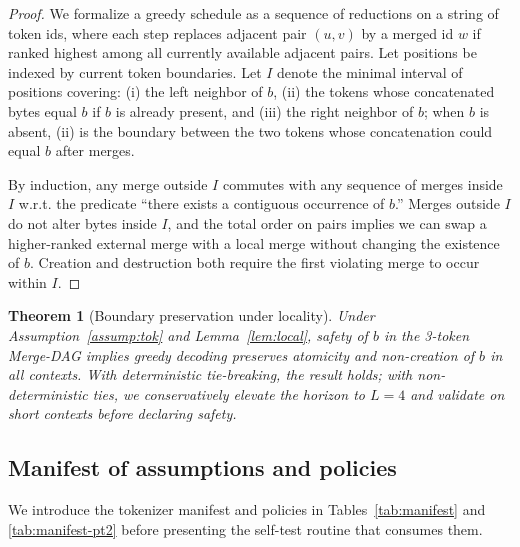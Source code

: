 \documentclass{article}
\newtheorem{theorem}{Theorem}
\begin{document}
\begin{proof}
We formalize a greedy schedule as a sequence of reductions on a string of token ids, where each step replaces adjacent pair $(u,v)$ by a merged id $w$ if ranked highest among all currently available adjacent pairs. Let positions be indexed by current token boundaries. Let $I$ denote the minimal interval of positions covering: (i) the left neighbor of $b$, (ii) the tokens whose concatenated bytes equal $b$ if $b$ is already present, and (iii) the right neighbor of $b$; when $b$ is absent, (ii) is the boundary between the two tokens whose concatenation could equal $b$ after merges.

By induction, any merge outside $I$ commutes with any sequence of merges inside $I$ w.r.t. the predicate ``there exists a contiguous occurrence of $b$.'' Merges outside $I$ do not alter bytes inside $I$, and the total order on pairs implies we can swap a higher-ranked external merge with a local merge without changing the existence of $b$. Creation and destruction both require the first violating merge to occur within $I$.
\end{proof}

\begin{theorem}[Boundary preservation under locality]\label{thm:bpe}
Under Assumption~\ref{assump:tok} and Lemma~\ref{lem:local}, safety of $b$ in the 3-token Merge-DAG implies greedy decoding preserves atomicity and non-creation of $b$ in all contexts. With deterministic tie-breaking, the result holds; with non-deterministic ties, we conservatively elevate the horizon to $L=4$ and validate on short contexts before declaring safety.
\end{theorem}

\subsection{Manifest of assumptions and policies}\label{sec:manifest}
We introduce the tokenizer manifest and policies in Tables~\ref{tab:manifest} and \ref{tab:manifest-pt2} before presenting the self-test routine that consumes them.
\end{document}
